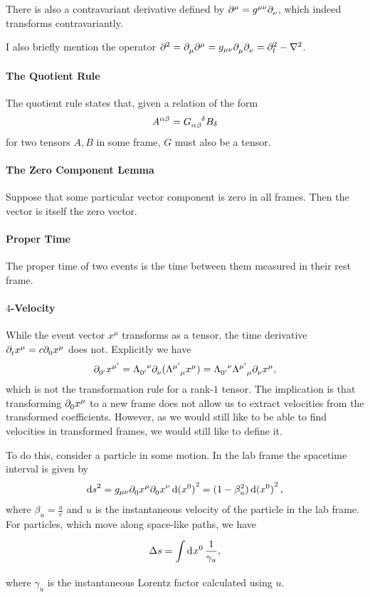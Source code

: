 There is also a contravariant derivative defined by $\del[\mu]{}{} = g^{\mu\nu}\del{\nu}{}$, which indeed transforms contravariantly.

I also briefly mention the operator $\del[2]{}{} = \del{\mu}{\del[\mu]{}{}} = g_{\mu\nu}\del{\mu}{\del{\nu}{}} = \del[2]{t}{} - \laplacian{}$. 

\paragraph{The Quotient Rule}
The quotient rule states that, given a relation of the form
\begin{align*}
	A^{\alpha\beta} = \tensor{G}{_{\alpha\beta}^{\delta}}B_{\delta}
\end{align*}
for two tensors $A, B$ in some frame, $G$ must also be a tensor.

\paragraph{The Zero Component Lemma}
Suppose that some particular vector component is zero in all frames. Then the vector is itself the zero vector.

\paragraph{Proper Time}
The proper time of two events is the time between them measured in their rest frame.

\paragraph{$4$-Velocity}
While the event vector $x^{\mu}$ transforms as a tensor, the time derivative $\del{t}{x^{\mu}} = c\del{0}{x^{\mu}}$ does not. Explicitly we have
\begin{align*}
	\del{0\p}{x^{\mu\p}} = \trcod{0\p}{\nu}\del{\nu}{(\trcou{\mu\p}{\mu}x^{\mu})} = \trcod{0\p}{\nu}\trcou{\mu\p}{\mu}\del{\nu}{x^{\mu}},
\end{align*}
which is not the transformation rule for a rank-$1$ tensor. The implication is that transforming $\del{0}{x^{\mu}}$ to a new frame does not allow us to extract velocities from the transformed coefficients. However, as we would still like to be able to find velocities in transformed frames, we would still like to define it.

To do this, consider a particle in some motion. In the lab frame the spacetime interval is given by
\begin{align*}
	\dd{s}^{2} = g_{\mu\nu}\del{0}{x^{\mu}}\del{0}{x^{\nu}}\dd{(x^{0})}^{2} = (1 - \beta_{u}^{2})\dd{(x^{0})}^{2},
\end{align*}
where $\beta_{u} = \frac{u}{c}$ and $u$ is the instantaneous velocity of the particle in the lab frame. For particles, which move along space-like paths, we have
\begin{align*}
	\Delta s = \integ{}{}{x^{0}}{\frac{1}{\gamma_{u}}},
\end{align*}
where $\gamma_{u}$ is the instantaneous Lorentz factor calculated using $u$.

